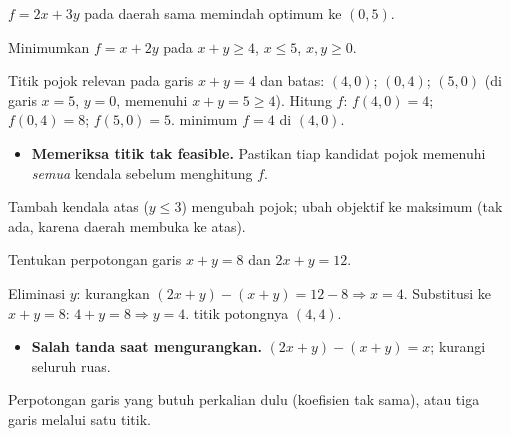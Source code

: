 \begin{variasi}
$f=2x+3y$ pada daerah sama memindah optimum ke $(0,5)$.
\end{variasi}

\begin{soalbox}{}
Minimumkan $f=x+2y$ pada $x+y\ge4$, $x\le5$, $x,y\ge0$.
\end{soalbox}

\jawab
{} Titik pojok relevan pada garis $x+y=4$ dan batas: $(4,0)$; $(0,4)$;
$(5,0)$ (di garis $x=5$, $y=0$, memenuhi $x+y=5\ge4$).
 Hitung $f$: $f(4,0)=4$; $f(0,4)=8$; $f(5,0)=5$.
\jadi minimum $f=4$ di $(4,0)$.

\begin{jebakan}
\begin{itemize}[leftmargin=*,topsep=2pt]
  \item \textbf{Memeriksa titik tak feasible.} Pastikan tiap kandidat pojok
  memenuhi \emph{semua} kendala sebelum menghitung $f$.
\end{itemize}
\end{jebakan}

\begin{variasi}
Tambah kendala atas ($y\le3$) mengubah pojok; ubah objektif ke maksimum (tak ada,
karena daerah membuka ke atas).
\end{variasi}

\begin{soalbox}{}
Tentukan perpotongan garis $x+y=8$ dan $2x+y=12$.
\end{soalbox}

\jawab
{} Eliminasi $y$: kurangkan $(2x+y)-(x+y)=12-8\Rightarrow x=4$.
 Substitusi ke $x+y=8$: $4+y=8\Rightarrow y=4$.
\jadi titik potongnya $(4,4)$.

\begin{jebakan}
\begin{itemize}[leftmargin=*,topsep=2pt]
  \item \textbf{Salah tanda saat mengurangkan.} $(2x+y)-(x+y)=x$; kurangi
  seluruh ruas.
\end{itemize}
\end{jebakan}

\begin{variasi}
Perpotongan garis yang butuh perkalian dulu (koefisien tak sama), atau tiga garis
melalui satu titik.
\end{variasi}

